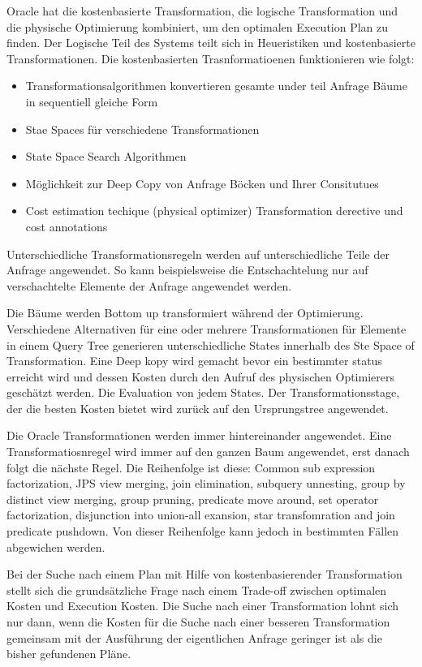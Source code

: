 Oracle hat die kostenbasierte Transformation, die logische Transformation und die physische Optimierung kombiniert, um den optimalen Execution Plan zu finden. Der Logische Teil des Systems teilt sich in Heueristiken und kostenbasierte Transformationen. Die kostenbasierten Trasnformatioenen funktionieren wie folgt:

\begin{itemize}
\item Transformationsalgorithmen konvertieren gesamte under teil Anfrage Bäume in sequentiell gleiche Form
\item Stae Spaces für verschiedene Transformationen
\item State Space Search Algorithmen
\item Möglichkeit zur Deep Copy von Anfrage Böcken und Ihrer Consitutues
\item Cost estimation techique (physical optimizer)
Transformation derective und cost annotations
\end{itemize}

Unterschiedliche Transformationsregeln werden auf unterschiedliche Teile der Anfrage angewendet. So kann beispielsweise die Entschachtelung nur auf verschachtelte Elemente der Anfrage angewendet werden. 

Die Bäume werden Bottom up transformiert während der Optimierung. Verschiedene Alternativen für eine oder mehrere Transformationen für Elemente in einem Query Tree generieren unterschiedliche States innerhalb des Ste Space of Transformation. Eine Deep kopy wird gemacht bevor ein bestimmter status erreicht wird und dessen Kosten durch den Aufruf des physischen Optimierers geschätzt werden. Die Evaluation von jedem States. Der Transformationsstage, der die besten Kosten bietet wird zurück auf den Ursprungstree angewendet.

Die Oracle Transformationen werden immer hintereinander angewendet. Eine Transformatiosnregel wird immer auf den ganzen Baum angewendet, erst danach folgt die nächste Regel. Die Reihenfolge ist diese: Common sub expression factorization, JPS view merging, join elimination, subquery unnesting, group by distinct view merging, group pruning, predicate move around, set operator factorization, disjunction into union-all exansion, star transfomration and join predicate pushdown. Von dieser Reihenfolge kann jedoch in bestimmten Fällen abgewichen werden. 



Bei der Suche nach einem Plan mit Hilfe von kostenbasierender Transformation stellt sich die grundsätzliche Frage nach einem Trade-off zwischen optimalen Kosten und Execution Kosten. Die Suche nach einer Transformation lohnt sich nur dann, wenn die Kosten für die Suche nach einer besseren Transformation gemeinsam mit der Ausführung der eigentlichen Anfrage geringer ist als die bisher gefundenen Pläne.

